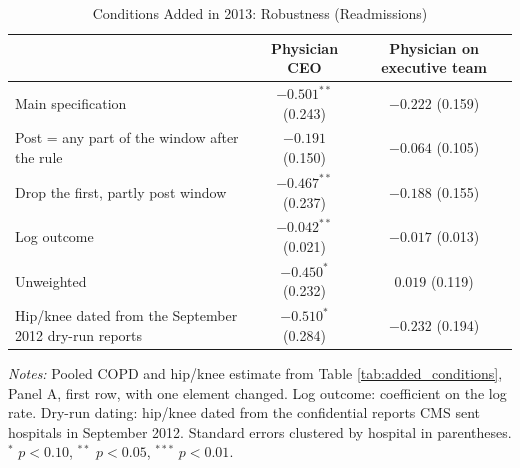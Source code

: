\begin{table}

\caption{\label{tab:app_added_conditions}Conditions Added in 2013: Robustness (Readmissions)}
\centering
\begin{threeparttable}
\begin{tabular}[t]{lcc}
\toprule
 & Physician CEO & Physician on executive team\\
\midrule
Main specification & $-0.501^{**}$ (0.243) & $-0.222$ (0.159)\\
Post = any part of the window after the rule & $-0.191$ (0.150) & $-0.064$ (0.105)\\
Drop the first, partly post window & $-0.467^{**}$ (0.237) & $-0.188$ (0.155)\\
Log outcome & $-0.042^{**}$ (0.021) & $-0.017$ (0.013)\\
Unweighted & $-0.450^{*}$ (0.232) & $0.019$ (0.119)\\
Hip/knee dated from the September 2012 dry-run reports & $-0.510^{*}$ (0.284) & $-0.232$ (0.194)\\
\bottomrule
\end{tabular}
\begin{tablenotes}[flushleft]
\footnotesize
\item \textit{Notes:} Pooled COPD and hip/knee estimate from Table \ref{tab:added_conditions}, Panel A, first row, with one element changed. Log outcome: coefficient on the log rate. Dry-run dating: hip/knee dated from the confidential reports CMS sent hospitals in September 2012. Standard errors clustered by hospital in parentheses. $^{*}$ $p<0.10$, $^{**}$ $p<0.05$, $^{***}$ $p<0.01$.
\end{tablenotes}
\end{threeparttable}
\end{table}
